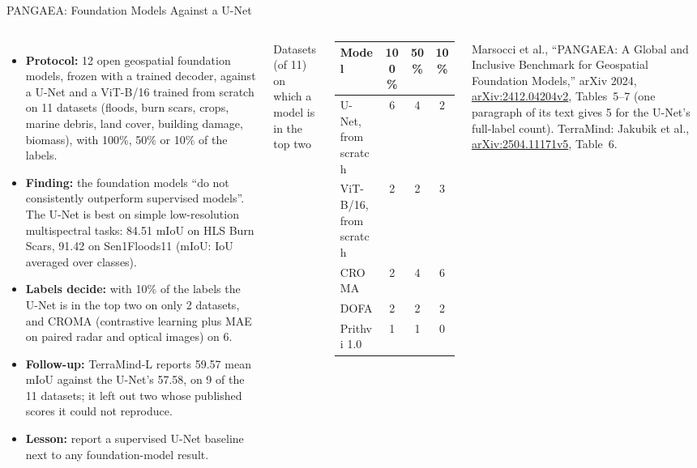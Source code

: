 \begin{frame}{PANGAEA: Foundation Models Against a U-Net}
  \begin{columns}[T,onlytextwidth]
      \begin{itemize}\footnotesize\itemsep0.25em
        \item \textbf{Protocol:} 12 open geospatial foundation models, frozen with a trained decoder, against a U-Net and a ViT-B/16 trained from scratch on 11 datasets (floods, burn scars, crops, marine debris, land cover, building damage, biomass), with 100\%, 50\% or 10\% of the labels.
        \item \textbf{Finding:} the foundation models ``do not consistently outperform supervised models''. The U-Net is best on simple low-resolution multispectral tasks: 84.51 mIoU on HLS Burn Scars, 91.42 on Sen1Floods11 (mIoU: IoU averaged over classes).
        \item \textbf{Labels decide:} with 10\% of the labels the U-Net is in the top two on only 2 datasets, and CROMA (contrastive learning plus MAE on paired radar and optical images) on 6.
        \item \textbf{Follow-up:} TerraMind-L reports 59.57 mean mIoU against the U-Net's 57.58, on 9 of the 11 datasets; it left out two whose published scores it could not reproduce.
        \item \textbf{Lesson:} report a supervised U-Net baseline next to any foundation-model result.
      \end{itemize}
      \centering
      \vspace{0.4em}
      {\footnotesize Datasets (of 11) on which a model is in the top two\par}
      \vspace{0.3em}
      {\scriptsize
      \begin{tabular}{>{\raggedright\arraybackslash}p{2.6cm} c c c}
        \toprule
        \textbf{Model} & \textbf{100\%} & \textbf{50\%} & \textbf{10\%} \\
        \midrule
        U-Net, from scratch & 6 & 4 & 2 \\
        ViT-B/16, from scratch & 2 & 2 & 3 \\
        \addlinespace[0.2em]
        CROMA & 2 & 4 & 6 \\
        DOFA & 2 & 2 & 2 \\
        Prithvi 1.0 & 1 & 1 & 0 \\
        \bottomrule
      \end{tabular}\par}
      \vspace{0.5em}
      {\scriptsize Marsocci et al., ``PANGAEA: A Global and Inclusive Benchmark for Geospatial Foundation Models,'' arXiv 2024, \href{https://arxiv.org/abs/2412.04204v2}{arXiv:2412.04204v2}, Tables~5--7 (one paragraph of its text gives 5 for the U-Net's full-label count). TerraMind: Jakubik et al., \href{https://arxiv.org/abs/2504.11171v5}{arXiv:2504.11171v5}, Table~6.\par}
  \end{columns}
\end{frame}

